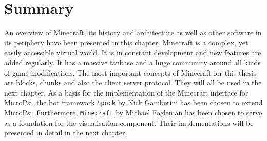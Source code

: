     \section{Summary}
An overview of Minecraft, its history and architecture as well as other software in its periphery have been presented in this chapter. Minecraft is a complex, yet easily accessible virtual world. It is in constant development and new features are added regularly. It has a massive fanbase and a huge community around all kinds of game modifications. The most important concepts of Minecraft for this thesis are blocks, chunks and also the client server protocol. They will all be used in the next chapter.
As a basis for the implementation of the Minecraft interface for MicroPsi, the bot framework \texttt{Spock} by Nick Gamberini has been chosen to extend MicroPsi.
Furthermore, \texttt{Minecraft} by Michael Fogleman has been chosen to serve as a foundation for the visualisation component. Their implementations will be presented in detail in the next chapter.